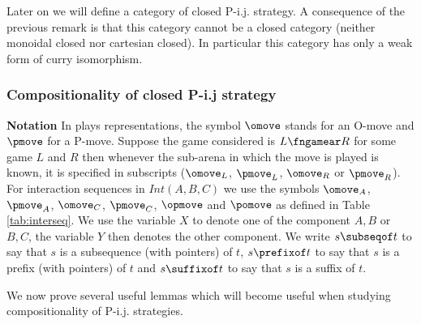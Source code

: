 Later on we will define a category of closed P-i.j. strategy. A consequence of the previous remark is that this category cannot be a closed category (neither monoidal closed nor cartesian closed).
In particular this category has only a weak form of curry isomorphism.

\subsubsection{Compositionality of closed P-i.j strategy}

{\bf Notation} In plays representations, the symbol $\omove$ stands
for an O-move and $\pmove$ for a P-move. Suppose the game considered
is $L\fngamear R$ for some game $L$ and $R$ then whenever the
sub-arena in which the move is played is known, it is specified in
subscripts ($\omove_L$, $\pmove_L$, $\omove_R$ or $\pmove_R$). For
interaction sequences in $Int(A,B,C)$ we use the symbols $\omove_A$,
$\pmove_A$, $\omove_C$, $\pmove_C$, $\opmove$ and $\pomove$ as
defined in Table \ref{tab:interseq}. We use the variable $X$ to
denote one of the component $A,B$ or $B,C$, the variable  $Y$ then
denotes the other component. We write $s \subseqof t$ to say that
$s$ is a subsequence (with pointers) of $t$, $s \prefixof t$ to say
that $s$ is a prefix (with pointers) of $t$ and  $s \suffixof t$ to
say that $s$ is a suffix of $t$.

We now prove several useful lemmas which will become useful when studying compositionality of P-i.j. strategies.

